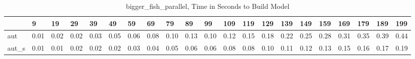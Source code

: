 \begin{table}
\centering
\caption{bigger_fish_parallel, Time in Seconds to Build Model}
\label{bigger_fish_parallel_model_time}
\begin{tabular}{lllllllllllllllllllll}
\toprule
{} &     9 &    19 &    29 &    39 &    49 &    59 &    69 &    79 &    89 &    99 &   109 &   119 &   129 &   139 &   149 &   159 &   169 &   179 &   189 &   199 \\
\midrule
aut   &  0.01 &  0.02 &  0.02 &  0.03 &  0.05 &  0.06 &  0.08 &  0.10 &  0.13 &  0.10 &  0.12 &  0.15 &  0.18 &  0.22 &  0.25 &  0.28 &  0.31 &  0.35 &  0.39 &  0.44 \\
aut\_s &  0.01 &  0.01 &  0.02 &  0.02 &  0.02 &  0.03 &  0.04 &  0.05 &  0.06 &  0.06 &  0.08 &  0.08 &  0.10 &  0.11 &  0.12 &  0.13 &  0.15 &  0.16 &  0.17 &  0.19 \\
\bottomrule
\end{tabular}
\end{table}
